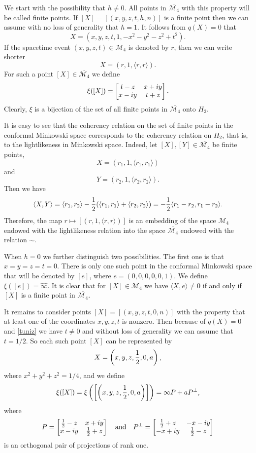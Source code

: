 \documentclass[10pt]{amsart}
\theoremstyle{definition}
\theoremstyle{remark}
\numberwithin{subsection}{section}
\numberwithin{equation}{section}
\newcommand\oi{{\widehat{\infty}}}
\begin{document}
We start with the possibility that $h \not = 0$. All points in $\overline{ \mathcal{M}_4 }$ with this property will be called finite points.
If  $[X] = [ (x,y,z,t,h,n) ]$  is a finite point
then we can assume with no loss of generality that $h=1$. It follows from $q(X) = 0$ that
\[
X =  (x,y,z,t,1,  -x^2 -y^2-z^2 + t^2).
\]
If the spacetime event $(x,y,z,t)\in \mathcal{M}_4$ is denoted by $r$, then we can write shorter
\[
X = (r,1, \langle r,r \rangle).
\]
For such a point $[X] \in \overline{ \mathcal{M}_4 }$ we define
\[
\xi ([X]) =  \left[ \begin{matrix}  t-z & x+iy \cr x-iy & t+z \cr\end{matrix} \right].
\]
Clearly, $\xi$ is a bijection of the set of all finite points in  $\overline{ \mathcal{M}_4 }$ onto $H_2$. 

It is easy to see that the coherency relation on the set of finite points in the conformal Minkowski space corresponds to the coherency relation on $H_2$, that is, to the lightlikeness in Minkowski space. 
Indeed, let $[X], [Y] \in \overline{ \mathcal{M}_4 }$ be finite points,
\[
X =  (r_1,1, \langle r_1,r_1 \rangle)
\]
and
\[
Y =  (r_2,1, \langle r_2,r_2 \rangle).
\]
Then
we have 
\[
\langle X, Y \rangle  =  \langle r_1 , r_2 \rangle -{1 \over 2} ( \langle r_1,r_1 \rangle +  \langle r_2,r_2 \rangle) = -{1 \over 2} \langle r_1-r_2,r_1-r_2 \rangle.
\]
Therefore, the map $r\mapsto  [(r,1, \langle r,r \rangle)]$ is an embedding of the space $\mathcal{M}_4$ endowed with the lightlikeness relation into the space $\overline{\mathcal{M}_4}$ endowed with the relation $\sim$.

When $h=0$ we further distinguish two possibilities. The first one is that $x=y=z=t=0$. There is only one such point in the conformal Minkowski space that will be denoted by $[e]$, where $e = (0,0,0,0,0,1)$. 
We define $\xi ([e]) = {\oi}$. It is clear that for $[X] \in \overline{ \mathcal{M}_4 }$ we have $\langle X, e \rangle \not= 0$ if and only if $[X]$ is a finite point in $\overline{ \mathcal{M}_4 }$.

It remains to consider points $[X] = [(x,y,z,t,0,n)]$ with the property that at least one of the coordinates $x,y,z,t$ is nonzero. Then because of $q(X) = 0$ and \eqref{tuniz} we have $t\not=0$ and without loss of generality we can assume that $t=1/2$. So each such point $[X]$ can be represented by
\begin{equation}\label{musi}
X =\left(x,y,z, {1 \over 2}, 0 , a \right) ,
\end{equation}
where $x^2 + y^2 + z^2 = 1/4$, 
and we define
\[
\xi ([X]) = \xi \left( \left[ \left(x,y,z, {1 \over 2}, 0 , a \right) \right] \right) = \infty P + aP^\perp,
\]
where 
\[
P = \left[ \begin{matrix}  {1 \over 2} -z & x+iy \cr x-iy & {1 \over 2} +z \cr\end{matrix} \right] \ \ \ \text{and} \  \ \ 
P^\perp = \left[ \begin{matrix}  {1 \over 2}   + z & -x-iy \cr -x+ iy & {1 \over 2} - z \cr\end{matrix} \right]
\]
is an orthogonal pair of projections of rank one.
\end{document}
